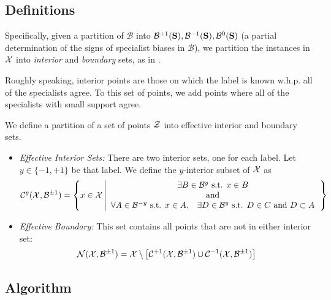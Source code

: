 \documentclass{article}
\newcommand{\lrb}[1]{\left[#1\right]}
\newcommand{\cB}{\mathcal{B}}
\newcommand{\universe}[1]{{\cal #1}}
\newcommand{\comment}[3]{\marginpar{\textcolor{#2}{#1: #3}}}
\newcommand{\yoav}[1]{\comment{Yoav}{blue}{#1}}
\begin{document}
\subsection{Definitions}

Specifically, given a partition of $\cB$ into
$\cB^{+1} (\sample{S}),\cB^{-1} (\sample{S}), \cB^{0} (\sample{S})$ 
(a partial determination of the signs of specialist biases in $\cB$), 
we partition the instances in $\universe{X}$ into {\em interior} and
{\em boundary} sets, as in \cite{ChadhuriDasgupta2015}. 

Roughly speaking, interior points are those on which the label is known w.h.p. all of the specialists agree. 
To this set of points, we add points where all of the specialists with small support agree. 

\yoav{I am planning to create a jupyter notebook and generate some figures that will be added here, to aid intuition.}

We define a partition of a set of points $\universe{Z}$ into effective
interior and boundary sets. 

\begin{itemize}
\item {\em  Effective Interior Sets:} There are two interior sets, one for each label.
  Let $y \in \{-1,+1\}$ be that label. We define the $y$-interior subset of $\universe{X}$ as
  \[
  \conform^{y} (\universe{X},\cB^{\pm 1}) =
  \left\{ x \in \universe{X} \left|
  \begin{array}{c}
    \exists B \in \cB^{y} \mbox{ s.t. } x \in B
    \\ \mbox{ and } \\
    \forall A \in \cB^{-y} \mbox{ s.t. } x \in
    A,\;\;\;
    \exists D \in \cB^{y} \mbox{ s.t. } D \in C
    \mbox{ and } D \subset A
  \end{array}
  \right. 
  \right\}
\]
\item {\em Effective Boundary:} This set contains all points that are not in either interior set:
  \[
  \nonconform(\universe{X},\cB^{\pm 1}) =
  \universe{X} \setminus \lrb{ \conform^{+1} (\universe{X},\cB^{\pm 1}) \cup \conform^{-1} (\universe{X},\cB^{\pm 1}) }
  \]
\end{itemize}


\subsection{Algorithm}
\end{document}
